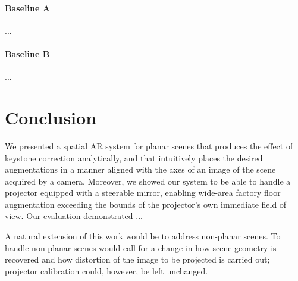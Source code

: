 \documentclass[review]{elsarticle}
\begin{document}
\paragraph{Baseline A} ...

\paragraph{Baseline B} ...

\section{Conclusion}

We presented a spatial AR system for planar scenes that produces the effect of keystone correction analytically, and that intuitively places the desired augmentations in a manner aligned with the axes of an image of the scene acquired by a camera. Moreover, we showed our system to be able to handle a projector equipped with a steerable mirror, enabling wide-area factory floor augmentation exceeding the bounds of the projector's own immediate field of view. Our evaluation demonstrated ...

A natural extension of this work would be to address non-planar scenes. To handle non-planar scenes would call for a change in how scene geometry is recovered and how distortion of the image to be projected is carried out; projector calibration could, however, be left unchanged.


\end{document}
